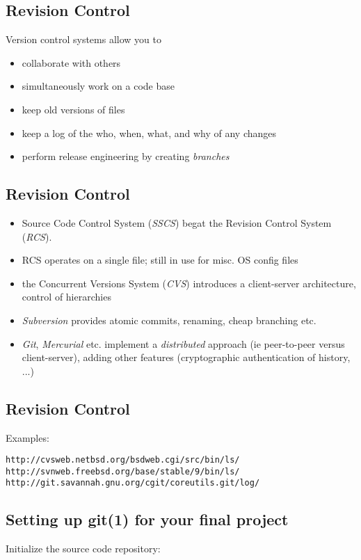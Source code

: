 \documentclass[xga]{xdvislides}
\begin{document}
\subsection{Revision Control}
Version control systems allow you to

\begin{itemize}
	\item collaborate with others
	\item simultaneously work on a code base
	\item keep old versions of files
	\item keep a log of the who, when, what, and why of any changes
	\item perform release engineering by creating {\em branches}
\end{itemize}

\subsection{Revision Control}
\begin{itemize}
	\item Source Code Control System ({\em SSCS}) begat the Revision
		Control System ({\em RCS}).
	\item RCS operates on a single file; still in use for misc. OS
		config files
	\item the Concurrent Versions System ({\em CVS}) introduces a
		client-server architecture, control of hierarchies
	\item {\em Subversion} provides atomic commits, renaming, cheap
		branching etc.
	\item {\em Git}, {\em Mercurial} etc. implement a {\em
		distributed} approach (ie peer-to-peer versus
		client-server), adding other features (cryptographic
		authentication of history, ...)
\end{itemize}

\subsection{Revision Control}
Examples:

{\tt http://cvsweb.netbsd.org/bsdweb.cgi/src/bin/ls/} \\

{\tt http://svnweb.freebsd.org/base/stable/9/bin/ls/} \\

{\tt http://git.savannah.gnu.org/cgit/coreutils.git/log/}

\subsection{Setting up git(1) for your final project}
Initialize the source code repository:
\\
\end{document}

